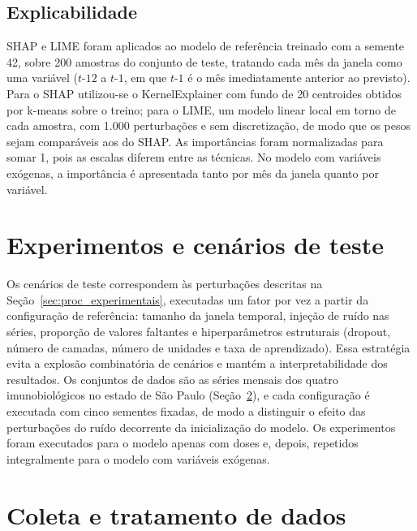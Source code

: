 \documentclass[
    12pt,
    openright,
    oneside,
    a4paper,
    english,
    brazil
]{abntex2}
\begin{document}
\subsection{Explicabilidade}
\label{subsec:impl_explicabilidade}

SHAP e LIME foram aplicados ao modelo de referência treinado com a semente 42, sobre 200 amostras do conjunto de teste, tratando cada mês da janela como uma variável ($t\text{-}12$ a $t\text{-}1$, em que $t\text{-}1$ é o mês imediatamente anterior ao previsto). Para o SHAP utilizou-se o KernelExplainer com fundo de 20 centroides obtidos por k-means sobre o treino; para o LIME, um modelo linear local em torno de cada amostra, com 1.000 perturbações e sem discretização, de modo que os pesos sejam comparáveis aos do SHAP. As importâncias foram normalizadas para somar 1, pois as escalas diferem entre as técnicas. No modelo com variáveis exógenas, a importância é apresentada tanto por mês da janela quanto por variável.

\section{Experimentos e cenários de teste}

Os cenários de teste correspondem às perturbações descritas na Seção~\ref{sec:proc_experimentais}, executadas um fator por vez a partir da configuração de referência: tamanho da janela temporal, injeção de ruído nas séries, proporção de valores faltantes e hiperparâmetros estruturais (dropout, número de camadas, número de unidades e taxa de aprendizado). Essa estratégia evita a explosão combinatória de cenários e mantém a interpretabilidade dos resultados. Os conjuntos de dados são as séries mensais dos quatro imunobiológicos no estado de São Paulo (Seção~\ref{sec:conjunto_dados}), e cada configuração é executada com cinco sementes fixadas, de modo a distinguir o efeito das perturbações do ruído decorrente da inicialização do modelo. Os experimentos foram executados para o modelo apenas com doses e, depois, repetidos integralmente para o modelo com variáveis exógenas.

\section{Coleta e tratamento de dados}
\label{sec:conjunto_dados}
\end{document}
